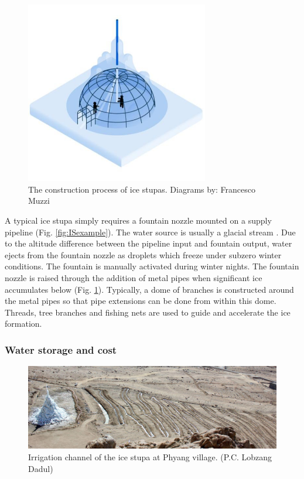 \begin{figure}[htb]
\centering
\includegraphics[width=8cm]{figs/IS_science.jpg}
\caption{The construction process of ice stupas. Diagrams by: Francesco Muzzi }
\label{fig:ISconstruction}
\end{figure}

A typical ice stupa  simply requires a fountain nozzle mounted on a supply pipeline (Fig. \ref{fig:ISexample}).
The water source is usually a glacial stream . Due to the altitude difference between the pipeline input and
fountain output, water ejects from the fountain nozzle as droplets which freeze under subzero winter conditions.
The fountain is manually activated during winter nights. The fountain nozzle is raised through the addition of
metal pipes when significant ice accumulates below (Fig. \ref{fig:ISconstruction}). Typically, a dome of
branches is constructed around the metal pipes so that pipe extensions can be done from within this dome.
Threads, tree branches and fishing nets are used to guide and accelerate the ice formation.

\subsubsection{Water storage and cost}

\begin{figure}[htb]
\centering
\includegraphics[width=\textwidth]{figs/IS_irrigation.jpeg}
\caption{Irrigation channel of the ice stupa at Phyang village. (P.C. Lobzang Dadul) }
\label{fig:ISirrigation}
\end{figure}

